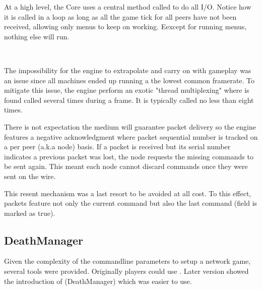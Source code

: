At a high level, the Core uses a central method called  to do all I/O. Notice how it is called in a loop as long as all the game tick for all peers have not been received, allowing only menus to keep on working. Eexcept for running menus, nothing else will run.\\
\par
{}\\
\par
The impossibility for the engine to extrapolate and carry on with gameplay was an issue since all machines ended up running a the lowest common framerate. To mitigate this issue, the engine perform an exotic "thread multiplexing" where  is found called several times during a frame. It is typically called no less than eight times.\\
\par
{}



There is not expectation the medium will guarantee packet delivery so the engine features a negative acknowledgment where packet sequential number is tracked on a per peer (a.k.a node) basis. If a packet is received but its serial number indicates a previous packet was lost, the node requests the missing commands to be sent again. This meant each node cannot discard commands once they were sent on the wire.\\
\par
This resent mechanism was a last resort to be avoided at all cost. To this effect, packets feature not only the current command but also the last command (field  is marked as true).\\





\subsection{DeathManager}
Given the complexity of the commandline parameters to setup a network game, several tools were provided. Originally players could use . Later version showed the introduction of (DeathManager) which was easier to use.\\
\par
{}
\\
\par











